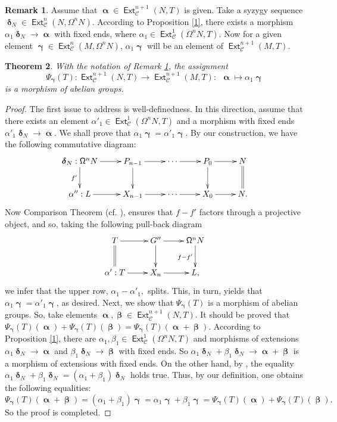 \documentclass[11pt,a4paper]{amsart}
\newcommand{\lrt}{\longrightarrow}
\newcommand{\C}{\mathscr{C} }
\def\Ext{\operatorname{{\mathsf{Ext}}}}
\def\syz{\mathsf{\Omega}}
\def\al{\operatorname{\boldsymbol{\alpha}}}
\def\be{\operatorname{\boldsymbol{\beta}}}
\def\ga{\operatorname{\boldsymbol{\gamma}}}
\def\de{\operatorname{\boldsymbol{\delta}}}
\newtheorem{theorem}{Theorem}[section]
\theoremstyle{definition}
\newtheorem{rem}[theorem]{Remark}
\theoremstyle{plain}
\theoremstyle{definition}
\numberwithin{equation}{section}
\begin{document}
\begin{rem}\label{r1}Assume that $\al\in\Ext^{n+1}_{\C}(N, T)$ is given. Take a syzygy sequence $\de_N\in\Ext^n_{\C}(N, \syz^nN)$.
According to Proposition \ref{1}, there exists a morphism $\alpha_1\de_N\lrt\al$ with fixed ends, where $\alpha_1\in\Ext^1_{\C}(\syz^nN, T)$. Now for a given element $\ga\in\Ext^n_{\C}(M, \syz^nN)$, $\alpha_1\ga$ will be an element of $\Ext^{n+1}_{\C}(M, T)$.
\end{rem}

\begin{theorem}\label{t1}With the notation of Remark \ref{r1}, the assignment
$$\Psi_{\ga}(T): \Ext^{n+1}_{\C}(N, T)\lrt\Ext^{n+1}_{\C}(M, T):~~\al\mapsto \alpha_1\ga $$
is a morphism of abelian groups.
\end{theorem}
\begin{proof}
The first issue to address is well-definedness. In this direction, assume that there exists an element  $\alpha'_1\in\Ext^1_{\C}(\syz^nN, T)$ and a morphism with fixed ends $\alpha'_1\de_N\lrt\al$. We shall prove that $\alpha_1\ga=\alpha'_1\ga$. By our construction, we have the following commutative diagram:
{\footnotesize\[\xymatrix{\de_N:\syz^{n}N\ar[d]_{f'}\ar[r] & P_{n-1}\ar[d]\ar[r] & \cdots\ar[r] & P_0\ar[r]\ar[d] & N\ar@{=}[d]\\ \alpha'':L\ar[r] & X_{n-1}\ar[r] & \cdots\ar[r] & X_0\ar[r] & N.}\]}Now Comparison Theorem (cf.  \cite[Theorem 6.16]{rot}), ensures that $f-f'$ factors through a projective object, and so, taking the following pull-back diagram
{\footnotesize \[\xymatrix{T\ar[r]\ar@{=}[d] & G''\ar[r]\ar[d] & {\syz}^{n}N\ar[d]_{f-f'} \\ \alpha':T\ar[r] & X_n\ar[r]& L,}\]}we infer that the upper row, $\alpha_1-\alpha'_1,$ splits. This, in turn, yields that $\alpha_1\ga=\alpha'_1\ga$, as desired. Next, we show that $\Psi_{\ga}(T)$ is a morphism of abelian groups. So, take elements  $\al, \be\in\Ext^{n+1}_{\C}(N, T)$. It should be proved that $\Psi_{\ga}(T)(\al)+\Psi_{\ga}(T)(\be)=\Psi_{\ga}(T)(\al+\be)$. According to Proposition \ref{1}, there are $\alpha_1, \beta_1\in\Ext^1_{\C}(\syz^nN, T)$ and morphisms of extensions $\alpha_1\de_N\lrt\al$ and $\beta_1\de_N\lrt\be$ with fixed ends. So $\alpha_1\de_N+\beta_1\de_N\lrt\al+\be$ is a morphism of extensions with fixed ends. On the other hand, by \cite[Chapter VII, Lemma 3.2]{mit},  the equality $\alpha_1\de_N+\beta_1\de_N=(\alpha_1+\beta_1)\de_N$ holds true. Thus, by our definition, one obtains the following equalities:
$$\Psi_{\ga}(T)(\al+\be)=(\alpha_1+\beta_1)\ga=\alpha_1\ga+\beta_1\ga=\Psi_{\ga}(T)(\al)+\Psi_{\ga}(T)(\be).$$
So the proof is completed.
\end{proof}
\end{document}
